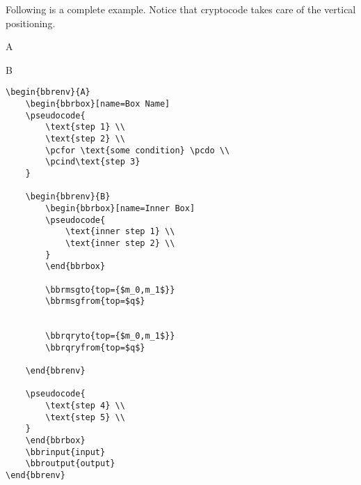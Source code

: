 \documentclass[a4paper]{report}
\begin{document}
Following is a complete example. Notice that cryptocode takes care of the vertical positioning.

\begin{bbrenv}{A}
	\begin{bbrbox}[name=Box Name]

	\begin{bbrenv}{B}
		\begin{bbrbox}[name=Inner Box]
		\end{bbrbox}
		



	\end{bbrenv}

	\end{bbrbox}
\end{bbrenv}

\begin{lstlisting}
\begin{bbrenv}{A}
	\begin{bbrbox}[name=Box Name]
	\pseudocode{
		\text{step 1} \\
		\text{step 2} \\
		\pcfor \text{some condition} \pcdo \\
		\pcind\text{step 3} 
	}

	\begin{bbrenv}{B}
		\begin{bbrbox}[name=Inner Box]
		\pseudocode{
			\text{inner step 1} \\
			\text{inner step 2} \\
		}
		\end{bbrbox}
		
		\bbrmsgto{top={$m_0,m_1$}}
		\bbrmsgfrom{top=$q$}


		\bbrqryto{top={$m_0,m_1$}}
		\bbrqryfrom{top=$q$}

	\end{bbrenv}

	\pseudocode{
		\text{step 4} \\
		\text{step 5} \\
	}
	\end{bbrbox}
	\bbrinput{input}
	\bbroutput{output}
\end{bbrenv}
\end{lstlisting}
\end{document}
